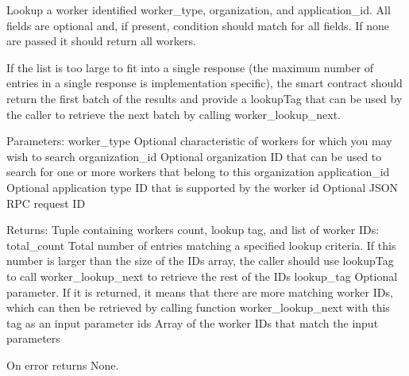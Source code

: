 \begin{DoxyVerb}Lookup a worker identified worker_type, organization, and
application_id.
All fields are optional and, if present, condition should match for
all fields. If none are passed it should return all workers.

If the list is too large to fit into a single response (the maximum
number of entries in a single response is implementation specific),
the smart contract should return the first batch of the results
and provide a lookupTag that can be used by the caller to
retrieve the next batch by calling worker_lookup_next.

Parameters:
worker_type     Optional characteristic of workers for which you may
        wish to search
organization_id Optional organization ID that can be used to search
        for one or more workers that belong to this
        organization
application_id  Optional application type ID that is supported by
        the worker
id              Optional JSON RPC request ID

Returns:
Tuple containing workers count, lookup tag, and list of
worker IDs:
total_count Total number of entries matching a specified
    lookup criteria. If this number is larger than the
    size of the IDs array, the caller should use
    lookupTag to call worker_lookup_next to retrieve
    the rest of the IDs
lookup_tag  Optional parameter. If it is returned, it means
    that there are more matching worker IDs, which can then
    be retrieved by calling function worker_lookup_next
    with this tag as an input parameter
ids         Array of the worker IDs that match the input parameters

On error returns None.
\end{DoxyVerb}
 \mbox{\label{classavalon__sdk_1_1connector_1_1interfaces_1_1worker__registry_1_1WorkerRegistry_ad488bae810e46e1222aa90db25b9aa18}} 
